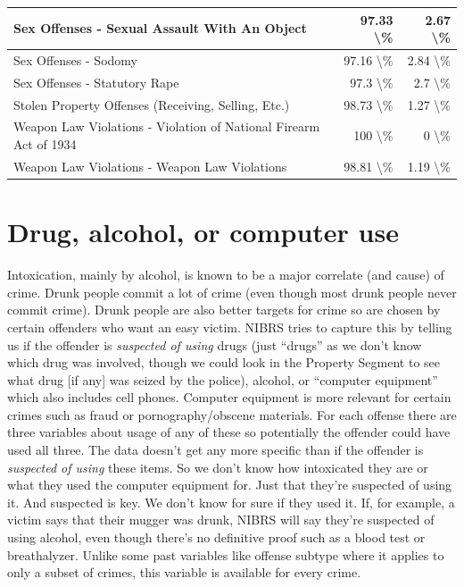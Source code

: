 \documentclass[
]{krantz}
\begin{document}
\begin{longtable}[t]{l|r|r}
\hline
Sex Offenses - Sexual Assault With An Object & 97.33 \textbackslash{}\% & 2.67 \textbackslash{}\%\\
\hline
Sex Offenses - Sodomy & 97.16 \textbackslash{}\% & 2.84 \textbackslash{}\%\\
\hline
Sex Offenses - Statutory Rape & 97.3 \textbackslash{}\% & 2.7 \textbackslash{}\%\\
\hline
Stolen Property Offenses (Receiving, Selling, Etc.) & 98.73 \textbackslash{}\% & 1.27 \textbackslash{}\%\\
\hline
Weapon Law Violations - Violation of National Firearm Act of 1934 & 100 \textbackslash{}\% & 0 \textbackslash{}\%\\
\hline
Weapon Law Violations - Weapon Law Violations & 98.81 \textbackslash{}\% & 1.19 \textbackslash{}\%\\
\hline
\end{longtable}

\section{Drug, alcohol, or computer
use}\label{drug-alcohol-or-computer-use}

Intoxication, mainly by alcohol, is known to be a major
correlate (and cause) of crime. Drunk people commit a lot of
crime (even though most drunk people never commit crime).
Drunk people are also better targets for crime so are chosen
by certain offenders who want an easy victim. NIBRS tries to
capture this by telling us if the offender is
\emph{suspected of using} drugs (just ``drugs'' as we don't
know which drug was involved, though we could look in the
Property Segment to see what drug {[}if any{]} was seized by
the police), alcohol, or ``computer equipment'' which also
includes cell phones. Computer equipment is more relevant
for certain crimes such as fraud or pornography/obscene
materials. For each offense there are three variables about
usage of any of these so potentially the offender could have
used all three. The data doesn't get any more specific than
if the offender is \emph{suspected of using} these items. So
we don't know how intoxicated they are or what they used the
computer equipment for. Just that they're suspected of using
it. And suspected is key. We don't know for sure if they
used it. If, for example, a victim says that their mugger
was drunk, NIBRS will say they're suspected of using
alcohol, even though there's no definitive proof such as a
blood test or breathalyzer. Unlike some past variables like
offense subtype where it applies to only a subset of crimes,
this variable is available for every crime.
\end{document}
